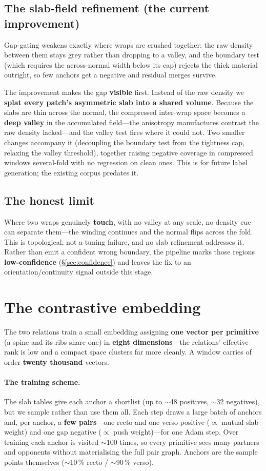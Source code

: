 \documentclass[10pt,twocolumn,a4paper]{article}
\begin{document}
\subsection{The slab-field refinement (the current improvement)}
Gap-gating weakens exactly where wraps are crushed together: the raw density
between them stays grey rather than dropping to a valley, and the boundary test
(which requires the across-normal width below its cap) rejects the thick material
outright, so few anchors get a negative and residual merges survive.

The improvement makes the gap \textbf{visible} first. Instead of the raw density
we \textbf{splat every patch's asymmetric slab into a shared volume}. Because the
slabs are thin across the normal, the compressed inter-wrap space becomes a
\textbf{deep valley} in the accumulated field---the anisotropy manufactures
contrast the raw density lacked---and the valley test fires where it could not.
Two smaller changes accompany it (decoupling the boundary test from the tightness
cap, relaxing the valley threshold), together raising negative coverage in
compressed windows several-fold with no regression on clean ones. This is for
future label generation; the existing corpus predates it.

\subsection{The honest limit}
Where two wraps genuinely \textbf{touch}, with no valley at any scale, no density
cue can separate them---the winding continues and the normal flips across the
fold. This is topological, not a tuning failure, and no slab refinement addresses
it. Rather than emit a confident wrong boundary, the pipeline marks those regions
\textbf{low-confidence} (\S\ref{sec:confidence}) and leaves the fix to an
orientation/continuity signal outside this stage.

\section{The contrastive embedding}\label{sec:embedding}
The two relations train a small embedding assigning \textbf{one vector per
primitive} (a spine and its ribs share one) in \textbf{eight dimensions}---the
relations' effective rank is low and a compact space clusters far more cleanly. A
window carries of order \textbf{twenty thousand} vectors.

\paragraph{The training scheme.} The slab tables give each anchor a shortlist (up
to $\sim$48 positives, $\sim$32 negatives), but we sample rather than use them
all. Each step draws a large batch of anchors and, per anchor, a \textbf{few
pairs}---one recto and one verso positive ($\propto$ mutual slab weight) and one
gap negative ($\propto$ push weight)---for one Adam step. Over training each
anchor is visited $\sim$100 times, so every primitive sees many partners and
opponents without materialising the full pair graph. Anchors are the sample
points themselves ($\sim$10\,\% recto / $\sim$90\,\% verso).
\end{document}
